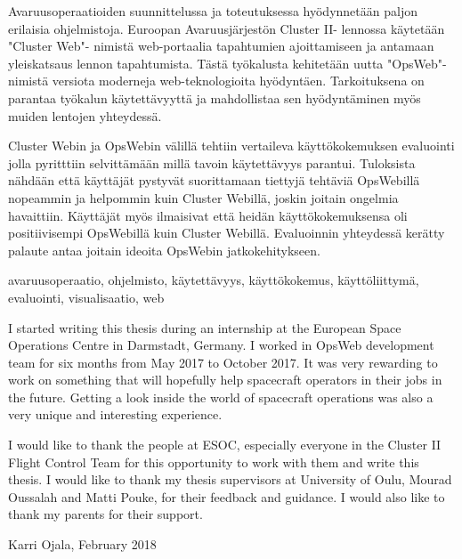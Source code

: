 \documentclass[a4paper, 12pt,titlepage]{dithesis}
\begin{document}
\begin{tiivistelma}
Avaruusoperaatioiden suunnittelussa ja toteutuksessa hyödynnetään paljon erilaisia ohjelmistoja. Euroopan Avaruusjärjestön Cluster II- lennossa käytetään "Cluster Web"- nimistä web-portaalia tapahtumien ajoittamiseen ja antamaan yleiskatsaus lennon tapahtumista. Tästä työkalusta kehitetään uutta "OpsWeb"- nimistä versiota moderneja web-teknologioita hyödyntäen. Tarkoituksena on parantaa työkalun käytettävyyttä ja mahdollistaa sen hyödyntäminen myös muiden lentojen yhteydessä.

Cluster Webin ja OpsWebin välillä tehtiin vertaileva käyttökokemuksen evaluointi jolla pyritttiin selvittämään millä tavoin käytettävyys parantui. Tuloksista nähdään että käyttäjät pystyvät suorittamaan tiettyjä tehtäviä OpsWebillä nopeammin ja helpommin kuin Cluster Webillä, joskin joitain ongelmia havaittiin. Käyttäjät myös ilmaisivat että heidän käyttökokemuksensa oli positiivisempi OpsWebillä kuin Cluster Webillä. Evaluoinnin yhteydessä kerätty palaute antaa joitain ideoita OpsWebin jatkokehitykseen.

\avainsanat avaruusoperaatio, ohjelmisto, käytettävyys, käyttökokemus, käyttöliittymä, evaluointi, visualisaatio, web
\end{tiivistelma}


\sisluettelo

I started writing this thesis during an internship at the European Space Operations Centre in Darmstadt, Germany. I worked in OpsWeb development team for six months from May 2017 to October 2017. It was very rewarding to work on something that will hopefully help spacecraft operators in their jobs in the future. Getting a look inside the world of spacecraft operations was also a very unique and interesting experience.

I would like to thank the people at ESOC, especially everyone in the Cluster II Flight Control Team for this opportunity to work with them and write this thesis. I would like to thank my thesis supervisors at University of Oulu, Mourad Oussalah and Matti Pouke, for their feedback and guidance. I would also like to thank my parents for their support.

Karri Ojala, February 2018


\setlongtables
\begin{longtable}[l]{p{3cm}p{}}



\end{longtable}
\setcounter{table}{0}
\end{document}

